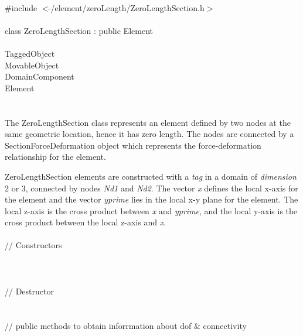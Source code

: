 
   \\
\indent \#include $<\tilde{ }$/element/zeroLength/ZeroLengthSection.h$>$  \\

  \\
\indent class ZeroLengthSection : public Element \\

 \\
\indent TaggedObject \\
\indent MovableObject \\
\indent\indent DomainComponent \\
\indent\indent\indent Element \\
\indent\indent\indent{} \\

  \\
\indent 
The ZeroLengthSection class represents an element defined by two nodes at the same geometric
location, hence it has zero length.
The nodes are connected by a SectionForceDeformation object which
represents the force-deformation relationship for the element. 

ZeroLengthSection elements are constructed with a {\em tag} in a domain of {\em dimension} 2 or 3,
connected by nodes {\em Nd1} and {\em Nd2}. 
The vector {\em x} defines the local x-axis for the element and the vector {\em yprime}
lies in the local x-y plane for the element.  The local z-axis is the cross product between 
{\em x} and {\em yprime}, and the local y-axis is the cross product between the local z-axis
and {\em x}.
\\

 \\
\indent // Constructors \\
 \\
 \\ \\
\indent // Destructor \\
 \\ \\
\indent    // public methods to obtain inforrmation about dof \& connectivity \\
 \\
 \\
 \\	
 \\

